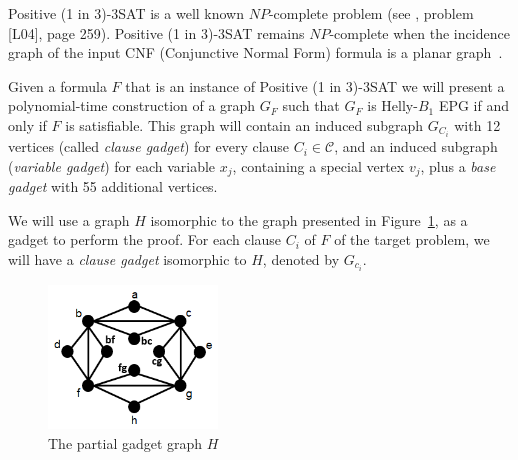 \documentclass[
submission
]{dmtcs-episciences}
\begin{document}
{\sc Positive (1 in 3)-3SAT } is a well known $NP$-complete problem (see \cite{johnson1979}, problem [L04], page 259). {\sc Positive (1 in 3)-3SAT} remains $NP$-complete when the incidence graph of the input CNF (Conjunctive Normal Form) formula is a planar graph~\cite{mulzer2008minimum}.

Given a formula $F$ that is an instance of {\sc Positive (1 in 3)-3SAT} we will present a polynomial-time construction of a graph $ G_F$ such that $ G_F $ is Helly-$B_1$ EPG if and only if $ F $ is satisfiable. This graph will contain an induced subgraph $ G_{C_i}$ with 12 vertices (called \emph {clause gadget}) for every clause $C_i \in \mathcal{C}$, and an induced subgraph (\emph {variable gadget}) for each variable $ x_j$, containing a special vertex  $ v_j$, plus a \emph{base gadget}  with 55 additional vertices.

We will use a graph $H$ isomorphic to the graph presented in Figure~\ref{fig:gadgetBase}, as a gadget to perform the proof. For each clause $C_i$ of $F$ of the target problem, we will have a \emph{clause gadget} isomorphic to $H$, denoted by $G_{c_i}$. %

\begin{figure}[htb]	
\center%
\includegraphics[width=4.5cm]{gadgetBase}
\caption{The partial gadget graph $H$}
\label{fig:gadgetBase}
\end{figure}



\end{document}
